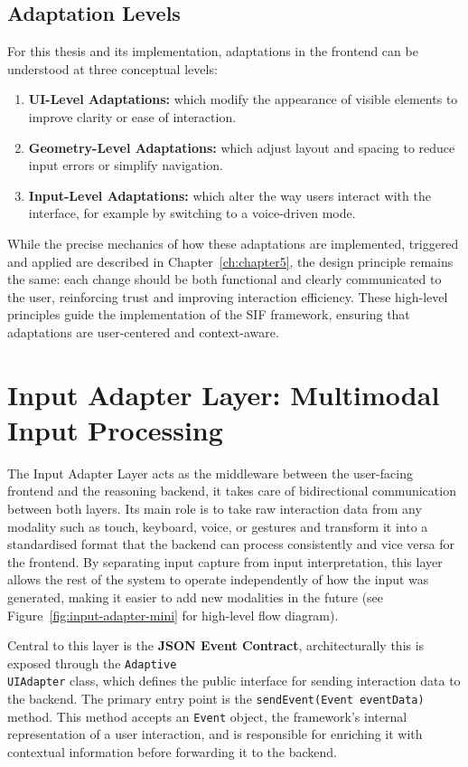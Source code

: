 \documentclass[openany]{book}
\begin{document}
\subsection{Adaptation Levels}
For this thesis and its implementation, adaptations in the frontend can be understood at three conceptual levels:
\begin{enumerate}
    \item \textbf{UI-Level Adaptations:} which modify the appearance of visible elements to improve clarity or ease of interaction.
    \item \textbf{Geometry-Level Adaptations:} which adjust layout and spacing to reduce input errors or simplify navigation.
    \item \textbf{Input-Level Adaptations:} which alter the way users interact with the interface, for example by switching to a voice-driven mode.
\end{enumerate}
While the precise mechanics of how these adaptations are implemented, triggered and applied are described in Chapter~\ref{ch:chapter5}, the design principle remains the same: each change should be both functional and clearly communicated to the user, reinforcing trust and improving interaction efficiency. These high-level principles guide the implementation of the SIF framework, ensuring that adaptations are user-centered and context-aware.

\section{Input Adapter Layer: Multimodal Input Processing}
The Input Adapter Layer acts as the middleware between the user-facing frontend and the reasoning backend, it takes care of bidirectional communication between both layers. Its main role is to take raw interaction data from any modality such as touch, keyboard, voice, or gestures and transform it into a standardised format that the backend can process consistently and vice versa for the frontend. By separating input capture from input interpretation, this layer allows the rest of the system to operate independently of how the input was generated, making it easier to add new modalities in the future  (see Figure~\ref{fig:input-adapter-mini} for high-level flow diagram).

Central to this layer is the \textbf{JSON Event Contract}, architecturally this is exposed through the \texttt{Adaptive\\UIAdapter} class, which defines the public interface for sending interaction data to the backend. The primary entry point is the \texttt{sendEvent(Event eventData)} method. This method accepts an \texttt{Event} object, the framework’s internal representation of a user interaction, and is responsible for enriching it with contextual information before forwarding it to the backend.
\end{document}
